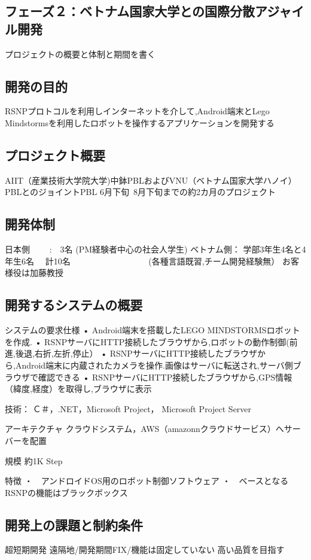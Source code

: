 \documentclass[paper]{jrsj}
\begin{document}
\subsection{フェーズ２：ベトナム国家大学との国際分散アジャイル開発}
プロジェクトの概要と体制と期間を書く

\subsection{開発の目的}
RSNPプロトコルを利用しインターネットを介して,Android端末とLego Mindstormsを利用したロボットを操作するアプリケーションを開発する

\subsection{プロジェクト概要}
AIIT（産業技術大学院大学)中鉢PBLおよびVNU（ベトナム国家大学ハノイ）PBLとのジョイントPBL
6月下旬~8月下旬までの約2カ月のプロジェクト

\subsection{開発体制}
日本側　　 :　3名 (PM経験者中心の社会人学生)
ベトナム側： 学部3年生4名と4年生6名　 計10名
　　　　　　　　　(各種言語既習,チーム開発経験無）
お客様役は加藤教授

\subsection{開発するシステムの概要}
システムの要求仕様
•	Android端末を搭載したLEGO MINDSTORMSロボットを作成.
•	RSNPサーバにHTTP接続したブラウザから,ロボットの動作制御(前進,後退,右折,左折,停止）
•	RSNPサーバにHTTP接続したブラウザから,Android端末に内蔵されたカメラを操作.画像はサーバに転送され,サーバ側ブラウザで確認できる
•	RSNPサーバにHTTP接続したブラウザから,GPS情報（緯度,経度）を取得し,ブラウザに表示

技術：
Ｃ＃，.NET，Microsoft Project， Microsoft Project Server

アーキテクチャ
クラウドシステム，AWS（amazonnクラウドサービス）へサーバーを配置

規模
約1K Step

特徴
・　アンドロイドOS用のロボット制御ソフトウェア
・　ベースとなるRSNPの機能はブラックボックス

\subsection{開発上の課題と制約条件}
超短期開発
遠隔地/開発期間FIX/機能は固定していない
高い品質を目指す
\end{document}
